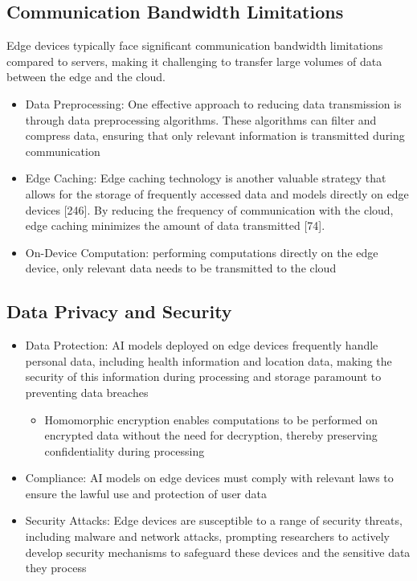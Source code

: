 \subsection{Communication Bandwidth Limitations}
Edge devices typically face significant communication bandwidth limitations compared to servers, making it challenging to transfer large volumes of data between the edge and the cloud.

\begin{itemize}
	\item Data Preprocessing: One effective approach to reducing data transmission is through data preprocessing algorithms. These algorithms can filter and compress data, ensuring that only relevant information is transmitted during communication 
	\item Edge Caching: Edge caching technology is another valuable strategy that allows for the storage of frequently accessed data and models directly on edge devices [246]. By reducing the frequency of communication with the cloud, edge caching minimizes the amount of data transmitted [74]. 
	\item On-Device Computation: performing computations directly on the edge device, only relevant data needs to be transmitted to the cloud
\end{itemize}


\subsection{Data Privacy and Security}

\begin{itemize}
	\item Data Protection: AI models deployed on edge devices frequently handle personal data, including health information and location data, making the security of this information during processing and storage paramount to preventing data breaches
		\begin{itemize}
			\item Homomorphic encryption enables computations to be performed on encrypted data without the need for decryption, thereby preserving confidentiality during processing
		\end{itemize}
	\item Compliance: AI models on edge devices must comply with relevant laws to ensure the lawful use and protection of user data
	\item Security Attacks: Edge devices are susceptible to a range of security threats, including malware and network attacks, prompting researchers to actively develop security mechanisms to safeguard these devices and the sensitive data they process
\end{itemize}

